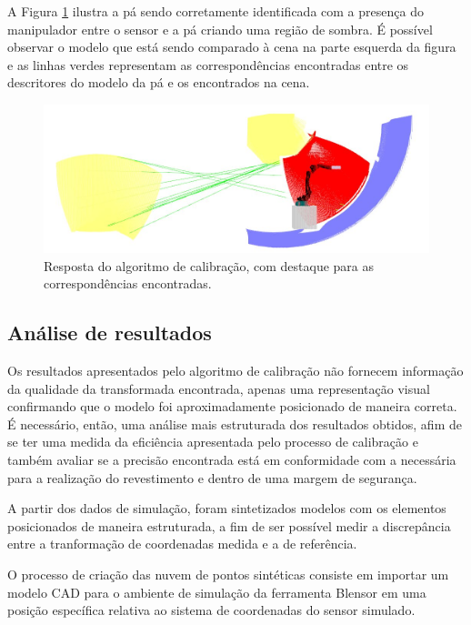 A Figura \ref{fig::sim_mh12}
ilustra a pá sendo corretamente identificada com a presença do manipulador entre
o sensor e a pá criando uma região de sombra. É possível observar o modelo que
está sendo comparado à cena na parte esquerda da figura e as linhas verdes
representam as correspondências encontradas entre os descritores do modelo da pá
e os encontrados na cena.

\begin{figure}[H]
	\centering
	\includegraphics[width=0.9\columnwidth]{method/figs/calibracao/sim_mh12_sp}
	\caption{Resposta do algoritmo de calibração, com destaque para as
	correspondências encontradas.}
    \label{fig::sim_mh12}
\end{figure}	



\subsection{Análise de resultados}

Os resultados apresentados pelo algoritmo de calibração não fornecem informação
da qualidade da transformada encontrada, apenas uma representação visual
confirmando que o modelo foi aproximadamente posicionado de maneira correta.
É necessário, então, uma análise mais estruturada dos resultados obtidos, afim
de se ter uma medida da eficiência apresentada pelo processo de calibração e
também avaliar se a precisão encontrada está em conformidade com a necessária
para a realização do revestimento e dentro de uma margem de segurança.

A partir dos dados de simulação, foram sintetizados modelos com os elementos
posicionados de maneira estruturada, a fim de ser possível medir a discrepância
entre a tranformação de coordenadas medida e a de referência. 

O processo de criação das nuvem de pontos sintéticas consiste em importar um
modelo CAD para o ambiente de simulação da ferramenta Blensor em uma posição
específica relativa ao sistema de coordenadas do sensor simulado. 

